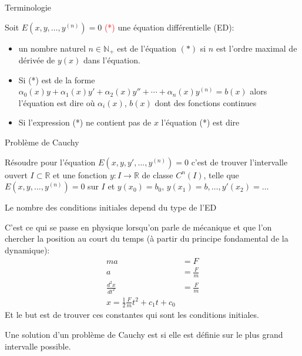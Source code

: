 \begin{parag}{Terminologie}
    \begin{definition}
    Soit $E(x, y, \dots, y^{(n)}) = 0$ \textcolor{red}{(*)} une équation différentielle (ED):
    \begin{itemize}
        \item  un nombre naturel $n \in \mathbb{N}_+$ est  de l'équation $(*)$ si $n$ est l'ordre maximal de dérivée de $y(x)$ dans l'équation.
        \item  Si (*) est de la forme $\alpha_0(x)y + \alpha_1(x)y' + \alpha_2(x)y'' + \cdots + \alpha_n(x)y^{(n)} = b(x)$ alors l'équation est dire  où $\alpha_i(x)$, $b(x)$ dont des fonctions continues
        \item  Si l'expression (*) ne contient pas de $x$ l'équation (*) est dire 
    \end{itemize}
    \end{definition}
\end{parag}
\begin{parag}{Problème de Cauchy}
    \begin{definition}
        Résoudre  pour l'équation $E(x, y, y', \dots, y^{(n)}) = 0$ c'est de trouver l'intervalle ouvert $I \subset \mathbb{R}$ et une fonction $y : I \to \mathbb{R}$ de classe $C^n (I)$, telle que $E(x, y, \dots, y^{(n)}) = 0$ sur $I$ et $y(x_0) = b_0$, $y(x_1) = b, \dots, y'(x_2) = \dots$
    \end{definition}
    Le nombre des conditions initiales depend du type de l'ED
    \begin{framedremark}
        C'est ce qui se passe en physique lorsqu'on parle de mécanique et que l'on chercher la position au court du temps (à partir du principe fondamental de la dynamique):
        \begin{align*}
            ma &= F\\
            a &= \frac{F}{m}\\
            \frac{d^2x}{dt^2} &= \frac{F}{m}\\
            x = \frac{1}{2}\frac{F}{m}t^2 + c_1 t + c_0
        \end{align*}
        Et le but est de trouver ces constantes qui sont les conditions initiales.
    \end{framedremark}
    \begin{definition}
        Une solution d'un problème de Cauchy est  si elle est définie sur le plus grand intervalle possible.
    \end{definition}
\end{parag}
